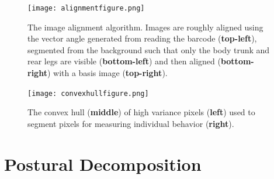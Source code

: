 \documentclass[11pt,a4paper,oneside]{article}
\begin{document}
\begin{appendices}
\begin{figure}
	\begin{center}
		\texttt{[image: alignmentfigure.png]}\\
	\end{center}
	\begin{flushleft}
		\caption{The image alignment algorithm. Images are roughly aligned using the vector angle generated from reading the barcode (\textbf{top-left}), segmented from the background such that only the body trunk and rear legs are visible (\textbf{bottom-left}) and then aligned (\textbf{bottom-right}) with a basis image (\textbf{top-right}).  \label{fig:alignment}} 
	\end{flushleft}
\end{figure} 

\begin{figure}
	\begin{center}
		\texttt{[image: convexhullfigure.png]}\\
	\end{center}
	\begin{flushleft}
		\caption{The convex hull (\textbf{middle}) of high variance pixels (\textbf{left}) used to segment pixels for measuring individual behavior (\textbf{right}).  \label{fig:convexhull}} 
	\end{flushleft}
\end{figure} 



\section{Postural Decomposition} \label{sec:posturaldecomposition}

\end{appendices}
\end{document}

